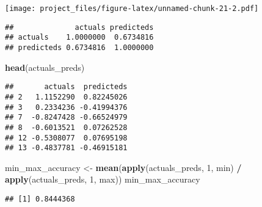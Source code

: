 \documentclass[
]{article}
\newenvironment{Shaded}{\begin{snugshade}}{\end{snugshade}}
\newcommand{\CommentTok}[1]{\textcolor[rgb]{0.56,0.35,0.01}{\textit{#1}}}
\newcommand{\DataTypeTok}[1]{\textcolor[rgb]{0.13,0.29,0.53}{#1}}
\newcommand{\DecValTok}[1]{\textcolor[rgb]{0.00,0.00,0.81}{#1}}
\newcommand{\KeywordTok}[1]{\textcolor[rgb]{0.13,0.29,0.53}{\textbf{#1}}}
\newcommand{\NormalTok}[1]{#1}
\newcommand{\OperatorTok}[1]{\textcolor[rgb]{0.81,0.36,0.00}{\textbf{#1}}}
\newcommand{\StringTok}[1]{\textcolor[rgb]{0.31,0.60,0.02}{#1}}
\begin{document}
\texttt{[image: project\_files/figure-latex/unnamed-chunk-21-2.pdf]}

\begin{Shaded}
\end{Shaded}

\begin{verbatim}
##              actuals predicteds
## actuals    1.0000000  0.6734816
## predicteds 0.6734816  1.0000000
\end{verbatim}

\begin{Shaded}
\begin{Highlighting}[]
\KeywordTok{head}\NormalTok{(actuals_preds)}
\end{Highlighting}
\end{Shaded}

\begin{verbatim}
##       actuals  predicteds
## 2   1.1152290  0.82245026
## 3   0.2334236 -0.41994376
## 7  -0.8247428 -0.66524979
## 8  -0.6013521  0.07262528
## 12 -0.5308077  0.07695198
## 13 -0.4837781 -0.46915181
\end{verbatim}

\begin{Shaded}
\begin{Highlighting}[]
\NormalTok{min_max_accuracy <-}\StringTok{ }\KeywordTok{mean}\NormalTok{(}\KeywordTok{apply}\NormalTok{(actuals_preds, }\DecValTok{1}\NormalTok{, min) }\OperatorTok{/}\StringTok{ }\KeywordTok{apply}\NormalTok{(actuals_preds, }\DecValTok{1}\NormalTok{, max))  }
\NormalTok{min_max_accuracy}
\end{Highlighting}
\end{Shaded}

\begin{verbatim}
## [1] 0.8444368
\end{verbatim}

\begin{Shaded}
\end{Shaded}
\end{document}
